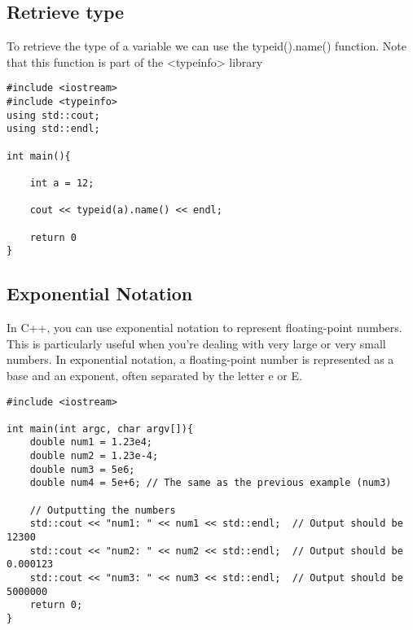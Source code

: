 \documentclass{report}
\begin{document}
    \bigbreak \noindent \bigbreak \noindent 
    \subsection{Retrieve type}
    \bigbreak \noindent 
    To retrieve the type of a variable we can use the typeid().name() function. Note that this function is part of the <typeinfo> library
    \bigbreak \noindent 
    \sepline
    \begin{verbatim}
#include <iostream>
#include <typeinfo>
using std::cout;
using std::endl;

int main(){

    int a = 12;

    cout << typeid(a).name() << endl;

    return 0
}
    \end{verbatim}
    \sepline
    \pagebreak \bigbreak \noindent 
    \subsection{Exponential Notation}
    \bigbreak \noindent 
    In C++, you can use exponential notation to represent floating-point numbers. This is particularly useful when you're dealing with very large or very small numbers. In exponential notation, a floating-point number is represented as a base and an exponent, often separated by the letter e or E.
    \bigbreak \noindent 
    \sepline
    \begin{verbatim}
#include <iostream>

int main(int argc, char argv[]){
    double num1 = 1.23e4;
    double num2 = 1.23e-4;
    double num3 = 5e6;
    double num4 = 5e+6; // The same as the previous example (num3)

    // Outputting the numbers
    std::cout << "num1: " << num1 << std::endl;  // Output should be 12300
    std::cout << "num2: " << num2 << std::endl;  // Output should be 0.000123
    std::cout << "num3: " << num3 << std::endl;  // Output should be 5000000
    return 0;
}
    \end{verbatim}
    \sepline
    \bigbreak \noindent 
    \bigbreak \noindent 
%
%
%
%
\end{document}
